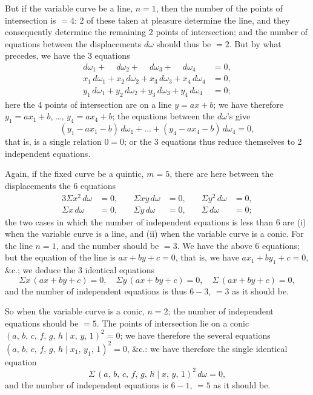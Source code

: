 \documentclass[11pt,a4paper]{book}
\begin{document}
But if the variable curve be a line, $n=1$, then the number of the points of intersection is $=4$: 2 of these taken at pleasure determine the line, and they consequently determine the remaining 2 points of intersection; and the number of equations between the displacements $d\omega$ should thus be $=2$. But by what precedes, we have the 3 equations
\begin{align*}
d\omega_1 + \phantom{x_1}\,d\omega_2 + \phantom{x_2}\,d\omega_3 + \phantom{x_3}\,d\omega_4 &= 0,\\
x_1\,d\omega_1 + x_2\,d\omega_2 + x_3\,d\omega_3 + x_4\,d\omega_4 &= 0,\\
y_1\,d\omega_1 + y_2\,d\omega_2 + y_3\,d\omega_3 + y_4\,d\omega_4 &= 0;
\end{align*}
here the 4 points of intersection are on a line $y = ax + b$; we have therefore $y_1 = ax_1 + b$, \ldots, $y_4 = ax_4 + b$; the equations between the $d\omega$'s give
\[
(y_1 - ax_1 - b)\,d\omega_1 + \ldots + (y_4 - ax_4 - b)\,d\omega_4 = 0,
\]
that is, is a single relation $0=0$; or the 3 equations thus reduce themselves to 2 independent equations.

Again, if the fixed curve be a quintic, $m=5$, there are here between the displacements the 6 equations
\begin{alignat*}{3}
\Sigma x^2\,d\omega &= 0,\quad & \Sigma xy\,d\omega &= 0,\quad & \Sigma y^2\,d\omega &= 0,\\
\Sigma x\,d\omega &= 0,\quad & \Sigma y\,d\omega &= 0,\quad & \Sigma\,d\omega &= 0;
\end{alignat*}
the two cases in which the number of independent equations is less than 6 are (i) when the variable curve is a line, and (ii) when the variable curve is a conic. For the line $n=1$, and the number should be $=3$. We have the above 6 equations; but the equation of the line is $ax + by + c = 0$, that is, we have $ax_1 + by_1 + c = 0$, \&c.; we deduce the 3 identical equations
\[
\Sigma x\,(ax+by+c) = 0,\quad \Sigma y\,(ax+by+c) = 0,\quad \Sigma\,(ax+by+c) = 0,
\]
and the number of independent equations is thus $6-3$, $=3$ as it should be.

So when the variable curve is a conic, $n=2$; the number of independent equations should be $=5$. The points of intersection lie on a conic $(a,\,b,\,c,\,f,\,g,\,h\!\mid\!x,\,y,\,1)^2 = 0$; we have therefore the several equations $(a,\,b,\,c,\,f,\,g,\,h\!\mid\!x_1,\,y_1,\,1)^2 = 0$, \&c.: we have therefore the single identical equation
\[
\Sigma\,(a,\,b,\,c,\,f,\,g,\,h\!\mid\!x,\,y,\,1)^2\,d\omega = 0,
\]
and the number of independent equations is $6-1$, $=5$ as it should be.
\end{document}
